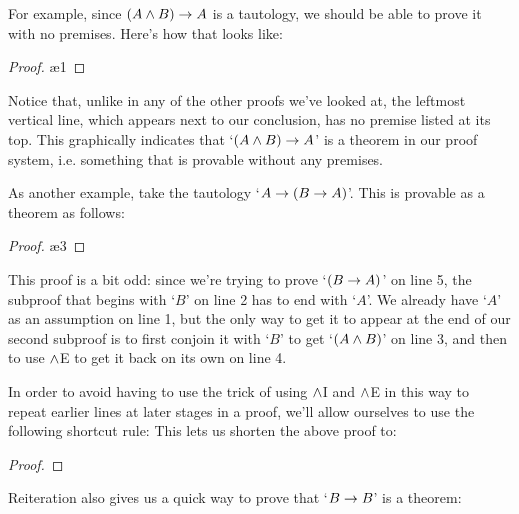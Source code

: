 For example, since $(A \wedge B) \rightarrow A$ is a tautology, we should be able to prove it with no premises.  Here's how that looks like:\\
\begin{proof}
\open
{}  
 \ae{1}
\close
{} 
\end{proof}
\noindent Notice that, unlike in any of the other proofs we've looked at, the leftmost vertical line, which appears next to our conclusion, has no premise listed at its top.  This graphically indicates that `$(A\wedge B)\rightarrow A$' is a theorem in our proof system, i.e. something that is provable without any premises.

As another example, take the tautology `$A \rightarrow (B \rightarrow A)$'.  This is provable as a theorem as follows:\\
\begin{proof}
\open
{}  
\open
{}  
 
 \ae{3}
\close
{} 
\close
{} 
\end{proof}
\noindent This proof is a bit odd: since we're trying to prove `$(B \rightarrow A)$' on line 5, the subproof that begins with `$B$' on line 2 has to end with `$A$'.  We already have `$A$' as an assumption on line 1, but the only way to get it to appear at the end of our second subproof is to first conjoin it with `$B$' to get `$(A \wedge B)$' on line 3, and then to use $\wedge$E to get it back on its own on line 4.

In order to avoid having to use the trick of using $\wedge$I and $\wedge$E in this way to repeat earlier lines at later stages in a proof, we'll allow ourselves to use the following shortcut rule:
This lets us shorten the above proof to:\\

\begin{proof}
\open
{} 
\open
{}  
 
\close
{} 
\close
{} 
\end{proof}

\noindent Reiteration also gives us a quick way to prove that `$B \rightarrow B$' is a theorem:\\

